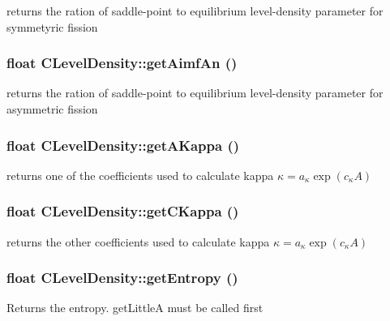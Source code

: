 returns the ration of saddle-point to equilibrium level-density parameter for symmetyric fission 
\subsubsection{\setlength{\rightskip}{0pt plus 5cm}float CLevel\-Density::get\-Aimf\-An ()\hspace{0.3cm}{\tt  [static]}}\label{classCLevelDensity_b5ae5183066b912f311399fee5f430ac}


returns the ration of saddle-point to equilibrium level-density parameter for asymmetric fission 
\subsubsection{\setlength{\rightskip}{0pt plus 5cm}float CLevel\-Density::get\-AKappa ()\hspace{0.3cm}{\tt  [static]}}\label{classCLevelDensity_d4b025eeaf50b2609a5f4a1aa2e1c695}


returns one of the coefficients used to calculate kappa $ \kappa = a_{\kappa} \exp\left(c_{\kappa} A\right) $ 
\subsubsection{\setlength{\rightskip}{0pt plus 5cm}float CLevel\-Density::get\-CKappa ()\hspace{0.3cm}{\tt  [static]}}\label{classCLevelDensity_d761161ac6272d6efb58796825fa7000}


returns the other coefficients used to calculate kappa $ \kappa = a_{\kappa} \exp\left(c_{\kappa} A\right) $ 
\subsubsection{\setlength{\rightskip}{0pt plus 5cm}float CLevel\-Density::get\-Entropy ()}\label{classCLevelDensity_f3c8dae34c2de62646d0061cbb6bbe82}


Returns the entropy. get\-Little\-A must be called first 
